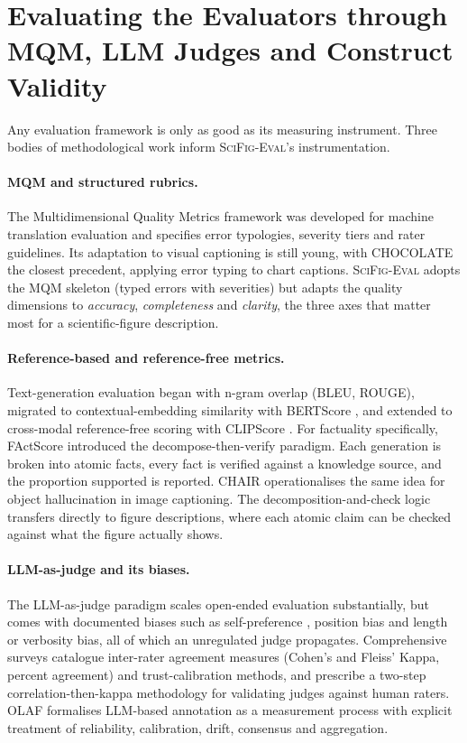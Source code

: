 \section{Evaluating the Evaluators through MQM, LLM Judges and Construct Validity}
\label{sec:lit-eval-of-eval}

Any evaluation framework is only as good as its measuring instrument.
Three bodies of methodological work inform \textsc{SciFig-Eval}'s
instrumentation.

\paragraph{MQM and structured rubrics.} The Multidimensional Quality
Metrics framework \citep{lommel2014multidimensional} was developed
for machine translation evaluation and specifies error typologies,
severity tiers and rater guidelines. Its adaptation to visual
captioning is still young, with CHOCOLATE \citep{huang2024chocolate}
the closest precedent, applying error typing to chart captions.
\textsc{SciFig-Eval} adopts the MQM skeleton (typed errors with
severities) but adapts the quality dimensions to \emph{accuracy},
\emph{completeness} and \emph{clarity}, the three axes that matter
most for a scientific-figure description.

\paragraph{Reference-based and reference-free metrics.}
Text-generation evaluation began with n-gram overlap (BLEU, ROUGE),
migrated to contextual-embedding similarity with BERTScore
\citep{zhang2020bertscore}, and extended to cross-modal
reference-free scoring with CLIPScore \citep{hessel2021clipscore}.
For factuality specifically, FActScore \citep{min2023factscore}
introduced the decompose-then-verify paradigm. Each generation is
broken into atomic facts, every fact is verified against a
knowledge source, and the proportion supported is reported. CHAIR
\citep{rohrbach2018chair} operationalises the same idea for object
hallucination in image captioning. The decomposition-and-check logic
transfers directly to figure descriptions, where each atomic claim
can be checked against what the figure actually shows.

\paragraph{LLM-as-judge and its biases.} The LLM-as-judge paradigm
\citep{zheng2023judging} scales open-ended evaluation
substantially, but comes with documented biases such as
self-preference \citep{wataoka2024selfpref}, position bias and
length or verbosity bias, all of which an unregulated judge
propagates. Comprehensive surveys \citep{llmjudges2024} catalogue
inter-rater agreement measures (Cohen's and Fleiss' Kappa, percent
agreement) and trust-calibration methods, and
\citet{judgesverdict2025} prescribe a two-step
correlation-then-kappa methodology for validating judges against
human raters. OLAF \citep{olaf2025} formalises LLM-based annotation
as a measurement process with explicit treatment of reliability,
calibration, drift, consensus and aggregation.

